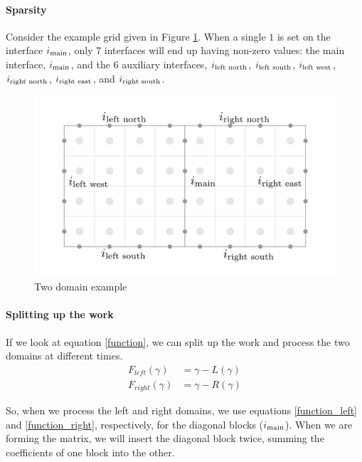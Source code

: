 \documentclass[12pt]{article}
\begin{document}
\paragraph{Sparsity}

Consider the example grid given in Figure \ref{2domain}.
When a single $1$ is set on the interface $i_{\textnormal{main}}$, only 7 interfaces will end up
having non-zero values: the main interface, $i_{\textnormal{main}}$, and the 6 auxiliary
interfaces, 
$i_{\textnormal{left north}}$, $i_{\textnormal{left south}}$, $i_{\textnormal{left west}}$,
$i_{\textnormal{right north}}$, $i_{\textnormal{right east}}$, and $i_{\textnormal{right south}}$.

\begin{figure}[H]
    \centering
    \includegraphics[width=6in]{images/2domain.pdf}
    \caption{Two domain example}
    \label{2domain}
\end{figure}

\paragraph{Splitting up the work}

If we look at equation \ref{function}, we can split up the work and process the two domains at
different times.
\begin{align}
    F_{left}(\gamma)&=\gamma-L(\gamma) \label{function_left}\\
    F_{right}(\gamma)&=\gamma-R(\gamma) \label{function_right}
\end{align}

So, when we process the left and right domains, we use equations \eqref{function_left} and 
\eqref{function_right}, respectively, for the diagonal blocks ($i_{\textnormal{main}}$).
When we are forming the matrix, we will insert the diagonal
block twice, summing the coefficients of one block into the other.
\end{document}
